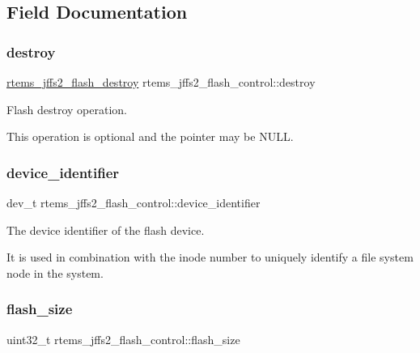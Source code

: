 \subsection{Field Documentation}
\mbox{\label{structrtems__jffs2__flash__control_aaf6cdd218f0b74fbf4b7f99cae81207e}} 
\subsubsection{\texorpdfstring{destroy}{destroy}}
{\footnotesize\ttfamily \mbox{\hyperlink{group__JFFS2_gad29663a4ea8c8bee3ca505f648dfe564}{rtems\+\_\+jffs2\+\_\+flash\+\_\+destroy}} rtems\+\_\+jffs2\+\_\+flash\+\_\+control\+::destroy}



Flash destroy operation. 

This operation is optional and the pointer may be {\ttfamily N\+U\+LL}. \mbox{\label{structrtems__jffs2__flash__control_aec8894822a4c1b524b6bd76de82204e0}} 
\subsubsection{\texorpdfstring{device\_identifier}{device\_identifier}}
{\footnotesize\ttfamily dev\+\_\+t rtems\+\_\+jffs2\+\_\+flash\+\_\+control\+::device\+\_\+identifier}



The device identifier of the flash device. 

It is used in combination with the inode number to uniquely identify a file system node in the system. \mbox{\label{structrtems__jffs2__flash__control_a202e3e645b838a0e82658a71de479963}} 
\subsubsection{\texorpdfstring{flash\_size}{flash\_size}}
{\footnotesize\ttfamily uint32\+\_\+t rtems\+\_\+jffs2\+\_\+flash\+\_\+control\+::flash\+\_\+size}



